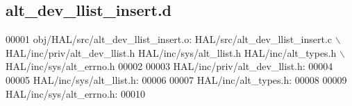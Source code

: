 \subsection{alt\+\_\+dev\+\_\+llist\+\_\+insert.\+d}
\label{alt__dev__llist__insert_8d_source}

\begin{DoxyCode}
00001 obj/HAL/src/alt_dev_llist_insert.o: HAL/src/alt_dev_llist_insert.c \(\backslash\)
 HAL/inc/priv/alt_dev_llist.h HAL/inc/sys/alt_llist.h HAL/inc/alt\_types.h \(\backslash\)
 HAL/inc/sys/alt_errno.h
00002 
00003 HAL/inc/priv/alt_dev_llist.h:
00004 
00005 HAL/inc/sys/alt_llist.h:
00006 
00007 HAL/inc/alt\_types.h:
00008 
00009 HAL/inc/sys/alt_errno.h:
00010 \end{DoxyCode}
